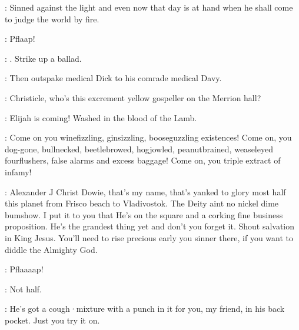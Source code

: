 \dowie:
Sinned against the light and even now that day is at hand
when he shall come to judge the world by fire.

:
Pflaap!

\stephen:
.
Strike up a ballad.

:
Then outspake medical Dick to his comrade medical Davy.

\bystander:
Christicle,
who's this excrement yellow gospeller on the Merrion hall?

\dowie:
Elijah is coming!
Washed in the blood of the Lamb.

\dowie:
Come on you winefizzling,
ginsizzling,
booseguzzling existences!
Come on,
you dog-gone,
bullnecked,
beetlebrowed,
hogjowled,
peanutbrained,
weaseleyed fourflushers,
false alarms and excess baggage!
Come on,
you triple extract of infamy!

\dowie:
Alexander J Christ Dowie,
that's my name,
that's
yanked to glory most half this planet from Frisco beach to Vladivostok.
The Deity aint no nickel dime bumshow.
I put it to you that He's on the
square and a corking fine business proposition.
He's the grandest thing
yet and don't you forget it.
Shout salvation in King Jesus.
You'll need
to rise precious early you sinner there,
if you want to diddle the
Almighty God.

:
Pflaaaap!

\stephen:
Not half.

\dowie:
He's got a cough·mixture with a punch in it for you,
my friend,
in his back pocket.
Just you try it on.


